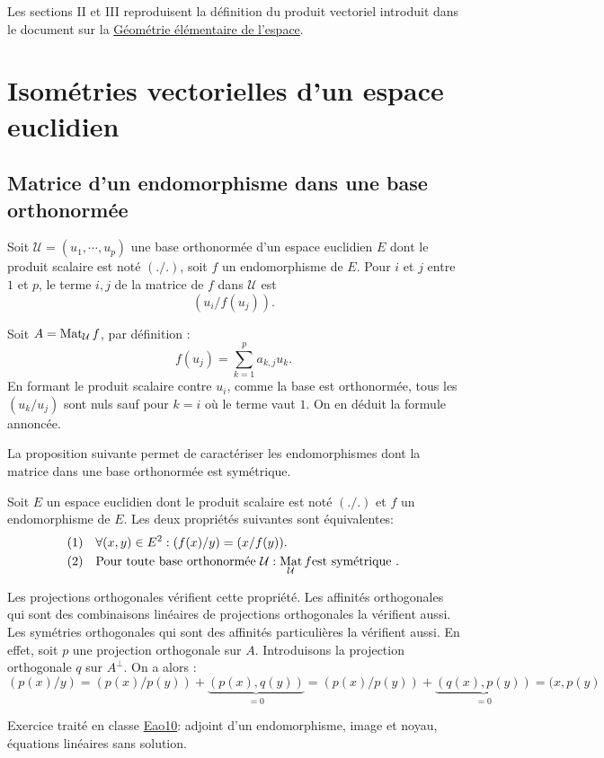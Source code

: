 

Les sections II et III reproduisent la définition du produit vectoriel introduit dans le document sur la \href{\baseurl C2006.pdf}{Géométrie élémentaire de l'espace}.
\section{Isométries vectorielles d'un espace euclidien}
\subsection{Matrice d'un endomorphisme dans une base orthonormée}
\begin{prop}
 Soit $\mathcal U=(u_1,\cdots,u_p)$ une base orthonormée d'un espace euclidien $E$ dont le produit scalaire est noté $(./.)$, soit $f$ un endomorphisme de $E$. Pour $i$ et $j$ entre $1$ et $p$, le terme $i,j$ de la matrice de $f$ dans $\mathcal U$ est 
\begin{displaymath}
 (u_i/f(u_j)).
\end{displaymath}
\end{prop}
\begin{demo}
 Soit $A=\mathop{\mathrm{Mat}}_{\mathcal U}f$, par définition :
\begin{displaymath}
 f(u_j) = \sum_{k=1}^p a_{k,j}u_k.
\end{displaymath}
En formant le produit scalaire contre $u_i$, comme la base est orthonormée, tous les $(u_k/u_j)$ sont nuls sauf pour $k=i$ où le terme vaut $1$. On en déduit la formule annoncée.
\end{demo}
La proposition suivante permet de caractériser les endomorphismes dont la matrice dans une base orthonormée est symétrique.
\begin{prop}
 Soit $E$ un espace euclidien dont le produit scalaire est noté $(./.)$ et $f$ un endomorphisme de $E$. Les deux propriétés suivantes sont équivalentes:
\begin{align*}
 &(1)& &\forall (x,y)\in E^2 : (f(x)/y) = (x/f(y)). \\
 &(2)& &\text{Pour toute base orthonormée }\mathcal U : \mathop{\mathrm{Mat}}_{\mathcal U}f \text{est symétrique .}
\end{align*}
\end{prop}
\begin{exple}
 Les projections orthogonales vérifient cette propriété. Les affinités orthogonales qui sont des combinaisons linéaires de projections orthogonales la vérifient aussi. Les symétries orthogonales qui sont des affinités particulières la vérifient aussi.\newline
En effet, soit $p$ une projection orthogonale sur $A$. Introduisons la projection orthogonale $q$ sur $A^\bot$. On a alors :
\begin{displaymath}
 (p(x)/y)=(p(x)/p(y))+ \underset{=0}{\underbrace{(p(x),q(y))}}
= (p(x)/p(y))+ \underset{=0}{\underbrace{(q(x),p(y))}}
= (x,p(y)
\end{displaymath}
\end{exple}
Exercice traité en classe \hyperref{\urlexo _fex_ao.pdf}{exo}{Eao10}{Eao10}: adjoint d'un endomorphisme, image et noyau, équations linéaires sans solution.


